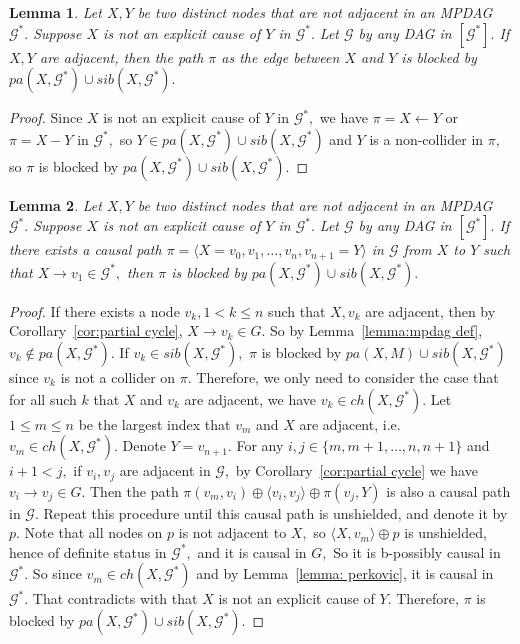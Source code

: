 \documentclass{article}
\newtheorem{lemma}{Lemma}
\begin{document}
\begin{lemma}
\label{lemma:explicit only if adjacent}
Let $X,Y$ be two distinct nodes that are not adjacent in an MPDAG $\mathcal{G}^*.$ Suppose $X$ is not an explicit cause of $Y$ in $\mathcal{G}^*.$ Let $\mathcal{G}$ by any DAG in $[\mathcal{G}^*].$ If $X,Y$ are adjacent, then the path $\pi$ as the edge between $X$ and $Y$ is blocked by $pa(X,\mathcal{G}^*)\cup sib(X,\mathcal{G}^*).$
\end{lemma}
\begin{proof}
Since $X$ is not an explicit cause of $Y$ in $\mathcal{G}^*,$ we have $\pi=X\leftarrow Y$ or $\pi=X-Y$ in $\mathcal{G}^*,$ so $Y\in pa(X,\mathcal{G}^*)\cup sib(X,\mathcal{G}^*)$ and $Y$ is a non-collider in $\pi,$ so $\pi$ is blocked by $pa(X,\mathcal{G}^*)\cup sib(X,\mathcal{G}^*).$ 
\end{proof}

\begin{lemma}
\label{lemma:explicit only if causal}
Let $X,Y$ be two distinct nodes that are not adjacent in an MPDAG $\mathcal{G}^*.$ Suppose $X$ is not an explicit cause of $Y$ in $\mathcal{G}^*.$ Let $\mathcal{G}$ by any DAG in $[\mathcal{G}^*].$ If there exists a causal path $\pi=\langle X=v_0,v_1,\dots,v_n,v_{n+1}=Y\rangle$ in $\mathcal{G}$ from $X$ to $Y$ such that $X\to v_1\in \mathcal{G}^*,$ then $\pi$ is blocked by $pa(X,\mathcal{G}^*)\cup sib(X,\mathcal{G}^*).$ 
\end{lemma}
\begin{proof}
If there exists a node $v_k, 1<k\le n$ such that $X,v_k$ are adjacent, then by Corollary~\ref{cor:partial cycle}, $X\to v_k\in G.$ So by Lemma~\ref{lemma:mpdag def}, $v_k\not\in pa(X,\mathcal{G}^*)$. If $v_k\in sib(X,\mathcal{G}^*),$ $\pi$ is blocked by $pa(X,M)\cup sib(X,\mathcal{G}^*)$ since $v_k$ is not a collider on $\pi.$ Therefore, we only need to consider the case that for all such $k$ that $X$ and $v_k$ are adjacent, we have $v_k\in ch(X,\mathcal{G}^*).$ Let $1\le m\le n$ be the largest index that $v_m$ and $X$ are adjacent, i.e. $v_m\in ch(X,\mathcal{G}^*).$ Denote $Y=v_{n+1}.$ For any $i,j\in \{m,m+1,\dots,n,n+1\}$ and $i+1<j,$ if $v_i,v_j$ are adjacent in $\mathcal{G},$ by Corollary~\ref{cor:partial cycle} we have $v_i\to v_j\in G$. Then the path $\pi(v_m,v_i)\oplus \langle v_i,v_j\rangle \oplus \pi(v_j,Y)$ is also a causal path in $\mathcal{G}.$ Repeat this procedure until this causal path is unshielded, and denote it by $p.$ Note that all nodes on $p$ is not adjacent to $X,$ so $\langle X,v_m\rangle \oplus p$ is unshielded, hence of definite status in $\mathcal{G}^*,$ and it is causal in $G,$ So it is b-possibly causal in $\mathcal{G}^*.$ So since $v_m\in ch(X,\mathcal{G}^*)$ and by Lemma~\ref{lemma: perkovic}, it is causal in $\mathcal{G}^*.$ That contradicts with that $X$ is not an explicit cause of $Y.$ Therefore, $\pi$ is blocked by $pa(X,\mathcal{G}^*)\cup sib(X,\mathcal{G}^*).$
\end{proof}
\end{document}
